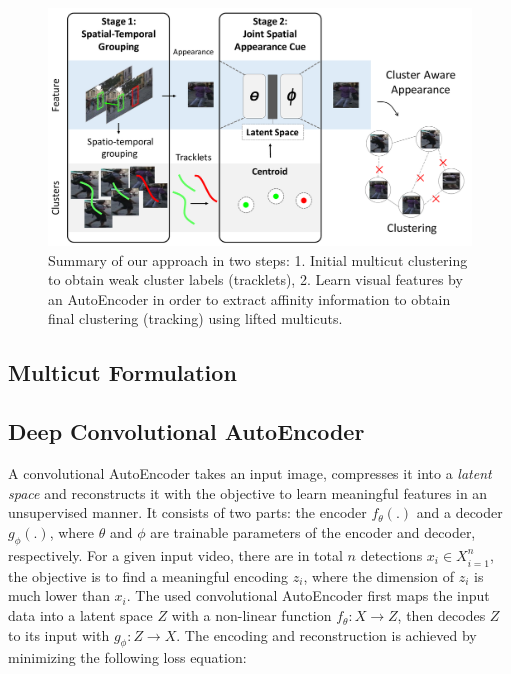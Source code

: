 \begin{figure}[t]
	\begin{center}
		\includegraphics[width=0.9\linewidth]{Fig_2_figure2.pdf}
	\end{center}
	\caption{Summary of our approach in two steps: 1. Initial multicut clustering to obtain weak cluster labels (tracklets), 2. Learn visual features by an AutoEncoder in order to extract affinity information to obtain final clustering (tracking) using lifted multicuts.}
	\label{fig:figure0}
\vspace*{-5mm}
\end{figure}

\subsection{Multicut Formulation}
\label{subsec:multicut}



\subsection{Deep Convolutional AutoEncoder}
\label{subsec:autoencoder}
A convolutional AutoEncoder takes an input image, compresses it into a \textit{latent space} and reconstructs it with the objective to learn meaningful features in an unsupervised manner. 
It consists of two parts: the encoder $f_\theta(.)$ and a decoder $g_\phi(.)$, where $\theta$ and $\phi$ are trainable parameters of the encoder and decoder, respectively. 
For a given input video, there are in total $n$ detections ${x_i \in X}_{i=1}^n$, the objective is to find a meaningful encoding $z_i$, where the dimension of $z_i$ is much lower than $x_i$. The used convolutional AutoEncoder first maps the input data into a latent space $Z$ with a non-linear function $f_\theta: X \rightarrow Z$, then decodes $Z$ to its input with $g_\phi:Z\rightarrow X$. 
The encoding and reconstruction is achieved by minimizing the following loss equation:

